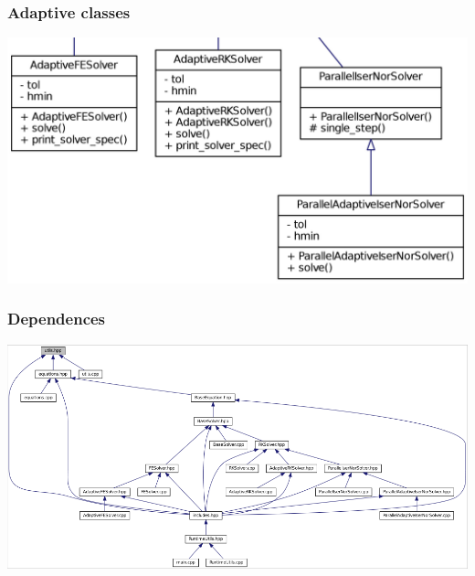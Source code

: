 \documentclass{beamer}
\begin{document}
\begin{frame} %
	\frametitle{Adaptive classes}
	\includegraphics[width=\linewidth]{etc/classes_adaptive.jpg}
\end{frame}


\begin{frame} %
	\frametitle{Dependences}
	\includegraphics[width=\linewidth]{etc/headers.png}
\end{frame}
\end{document}
